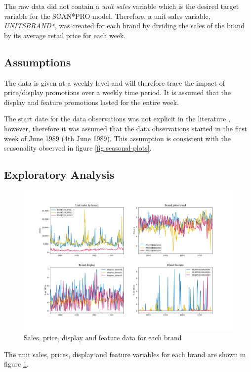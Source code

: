 \documentclass[a4paper,11pt]{article}
\begin{document}
The raw data did not contain a \textit{unit sales} variable which is the desired target variable for the SCAN*PRO model. Therefore, a unit sales variable, \textit{UNITSBRAND*}, was created for each brand by dividing the sales of the brand by its average retail price for each week.


\subsection{Assumptions}
The data is given at a weekly level and will therefore trace the impact of price/display promotions over a weekly time period. It is assumed that the display and feature promotions lasted for the entire week.

The start date for the data observations was not explicit in the literature \citep{srinivasan_promotions_2004}, however, therefore it was assumed that the data observations started in the first week of June 1989 (4th June 1989). This assumption is consistent with the seasonality observed in figure \ref{fig:seasonal-plots}.

\subsection{Exploratory Analysis}


\begin{figure}
  \centering
  \includegraphics[scale=0.38]{eda_plots}
  \caption{Sales, price, display and feature data for each brand}\label{fig:eda-plots}
\end{figure}

The unit sales, prices, display and feature variables for each brand are shown in figure \ref{fig:eda-plots}. 
\end{document}
